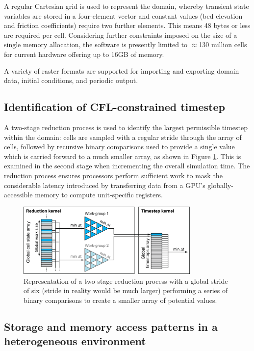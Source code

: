 A regular Cartesian grid is used to represent the domain, whereby transient state variables are stored in a four-element vector and constant values (bed elevation and friction coefficients) require two further elements. This means 48 bytes or less are required per cell. Considering further constraints imposed on the size of a single memory allocation, the software is presently limited to $\approx$130 million cells for current hardware offering up to 16GB of memory.

A variety of raster formats are supported for importing and exporting domain data, initial conditions, and periodic output. 

\subsection{Identification of CFL-constrained timestep}

A two-stage reduction process is used to identify the largest permissible timestep within the domain: cells are sampled with a regular stride through the array of cells, followed by recursive binary comparisons used to provide a single value which is carried forward to a much smaller array, as shown in Figure \ref{HiPIMS_Reduction}. This is examined in the second stage when incrementing the overall simulation time. The reduction process ensures processors perform sufficient work to mask the considerable latency introduced by transferring data from a GPU's globally-accessible memory to compute unit-specific registers.

\begin{figure}[tpb]
	\centering
	\includegraphics[width=0.8\textwidth]{heterogeneous-dev-figures/HiPIMS_Reduction_Colour.png}
	\caption{Representation of a two-stage reduction process with a global stride of six (stride in reality would be much larger) performing a series of binary comparisons to create a smaller array of potential values.}
	\label{HiPIMS_Reduction}
\end{figure}

\subsection{Storage and memory access patterns in a heterogeneous environment}
\label{Subsection:StorageMemoryHeterogeneous}

